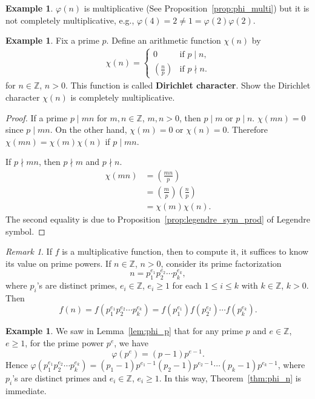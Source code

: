 \documentclass{amsbook}
\theoremstyle{plain}
\theoremstyle{definition}
\newtheorem{example}[theorem]{Example}
\theoremstyle{remark}
\newtheorem{remark}[theorem]{Remark}
\numberwithin{equation}{chapter}
\numberwithin{figure}{chapter}
\newcommand{\Z}{\mathbb{Z}}
\begin{document}
\begin{example}
  $\varphi(n)$ is multiplicative (See Proposition~\ref{prop:phi_multi}) but it is not completely multiplicative, e.g., $\varphi(4) = 2 \neq 1 = \varphi(2) \varphi(2)$.
\end{example}
\begin{example}
  Fix a prime $p$. Define an arithmetic function $\chi (n)$ by
\begin{align}
\chi (n) = \left\{  \begin{array}{cl} 
                      0 & \text{if $p \mid n$,} \\[1mm]
                      \left(\frac{n}p \right) & \text{if $p \nmid n$.} 
                    \end{array} \right.
\end{align}
for $n \in \Z$, $n > 0$. This function is called \textbf{Dirichlet character}.   Show the Dirichlet character $\chi (n)$ is completely multiplicative. 
\end{example}
\begin{proof}
  If a prime $p \mid mn$ for $m,n \in \Z$, $m,n > 0$, then $p \mid m$ or $p \mid n$. $\chi (mn) = 0$ since $p \mid mn$. On the other hand, $\chi (m) = 0$ or $\chi (n) = 0$. Therefore $\chi (mn) = \chi (m) \chi (n)$ if $p \mid mn$.

  If $p \nmid mn$, then $p \nmid m$ and $p \nmid n$. 
\begin{align}
  \chi (mn) &= \left( \frac{mn}p \right) \\
            &= \left( \frac{m}p \right) \left( \frac{n}p \right) \\
            &= \chi (m) \chi (n).
\end{align}
The second equality is due to Proposition~\ref{prop:legendre_sym_prod} of Legendre symbol.
\end{proof}

\begin{remark}
If $f$ is a multiplicative function, then to compute it, it suffices to know its value on prime powers. If $n \in \Z$, $n > 0$, consider its prime factorization
\[
n = p_1^{e_1}p_2^{e_2} \cdots p_k^{e_k},
\]
where $p_i$'s are distinct primes, $e_i \in \Z$, $e_i \geqslant 1$ for each $1 \leqslant i \leqslant k$ with $k \in \Z$, $k > 0$. Then 
\[
  f(n) = f(p_1^{e_1}p_2^{e_2} \cdots p_k^{e_k}) 
       = f(p_1^{e_1}) f(p_2^{e_2}) \cdots f(p_k^{e_k}).
\]
\end{remark}
\begin{example}
  We saw in Lemma~\ref{lem:phi_p} that for any prime $p$ and $e \in \Z$, $e \geqslant 1$,  for the prime power $p^e$, we have
\[
\varphi (p^e) = (p-1)p^{e-1}.
\]
Hence $\varphi (p_1^{e_1}p_2^{e_2} \cdots p_k^{e_k}) = (p_1-1)p^{e_1-1} (p_2-1)p^{e_2-1} \cdots (p_k-1)p^{e_k-1}$, where $p_i$'s are distinct primes and $e_i \in \Z$, $e_i \geqslant 1$. In this way, Theorem~\ref{thm:phi_n} is immediate.
\end{example}
\end{document}
